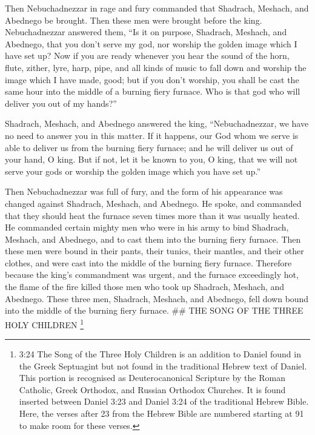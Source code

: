  Then Nebuchadnezzar in rage and fury commanded that
Shadrach, Meshach, and Abednego be brought. Then these men were brought
before the king.  Nebuchadnezzar answered them, ``Is it on
purpose, Shadrach, Meshach, and Abednego, that you don't serve my god,
nor worship the golden image which I have set up?  Now if
you are ready whenever you hear the sound of the horn, flute, zither,
lyre, harp, pipe, and all kinds of music to fall down and worship the
image which I have made, good; but if you don't worship, you shall be
cast the same hour into the middle of a burning fiery furnace. Who is
that god who will deliver you out of my hands?''

 Shadrach, Meshach, and Abednego answered the king,
``Nebuchadnezzar, we have no need to answer you in this matter.
 If it happens, our God whom we serve is able to deliver us
from the burning fiery furnace; and he will deliver us out of your hand,
O king.  But if not, let it be known to you, O king, that
we will not serve your gods or worship the golden image which you have
set up.''

 Then Nebuchadnezzar was full of fury, and the form of his
appearance was changed against Shadrach, Meshach, and Abednego. He
spoke, and commanded that they should heat the furnace seven times more
than it was usually heated.  He commanded certain mighty
men who were in his army to bind Shadrach, Meshach, and Abednego, and to
cast them into the burning fiery furnace.  Then these men
were bound in their pants, their tunics, their mantles, and their other
clothes, and were cast into the middle of the burning fiery furnace.
 Therefore because the king's commandment was urgent, and
the furnace exceedingly hot, the flame of the fire killed those men who
took up Shadrach, Meshach, and Abednego.  These three men,
Shadrach, Meshach, and Abednego, fell down bound into the middle of the
burning fiery furnace. \#\# THE SONG OF THE THREE HOLY CHILDREN
\footnote{3:24 The Song of the Three Holy Children is an addition to
  Daniel found in the Greek Septuagint but not found in the traditional
  Hebrew text of Daniel. This portion is recognised as Deuterocanonical
  Scripture by the Roman Catholic, Greek Orthodox, and Russian Orthodox
  Churches. It is found inserted between Daniel 3:23 and Daniel 3:24 of
  the traditional Hebrew Bible. Here, the verses after 23 from the
  Hebrew Bible are numbered starting at 91 to make room for these
  verses.}

